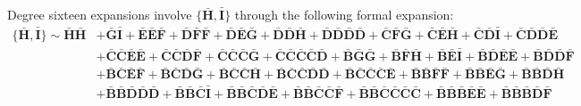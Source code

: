 \documentclass[10pt]{amsart}
\theoremstyle{definition}
\theoremstyle{corollary}
\theoremstyle{remark}
\theoremstyle{conclusion}
\begin{document}
Degree sixteen expansions involve $\{\bar{\mathbf{H}},\bar{\mathbf{I}} \}$ through the following formal expansion:
\begin{align}
	\{\bar{\mathbf{H}}, \bar{\mathbf{I}}\} \sim \bar{\mathbf{H}}\bar{\mathbf{H}}&+\bar{\mathbf{G}}\bar{\mathbf{I}}+\bar{\mathbf{E}}\bar{\mathbf{E}}\bar{\mathbf{F}}+\bar{\mathbf{D}}\bar{\mathbf{F}}\bar{\mathbf{F}}+\bar{\mathbf{D}}\bar{\mathbf{E}}\bar{\mathbf{G}}+\bar{\mathbf{D}}\bar{\mathbf{D}}\bar{\mathbf{H}}+\bar{\mathbf{D}}\bar{\mathbf{D}}\bar{\mathbf{D}}\bar{\mathbf{D}}+\bar{\mathbf{C}}\bar{\mathbf{F}}\bar{\mathbf{G}}+\bar{\mathbf{C}}\bar{\mathbf{E}}\bar{\mathbf{H}}+\bar{\mathbf{C}}\bar{\mathbf{D}}\bar{\mathbf{I}}+\bar{\mathbf{C}}\bar{\mathbf{D}}\bar{\mathbf{D}}\bar{\mathbf{E}}\nonumber \\
	&+\bar{\mathbf{C}}\bar{\mathbf{C}}\bar{\mathbf{E}}\bar{\mathbf{E}}+\bar{\mathbf{C}}\bar{\mathbf{C}}\bar{\mathbf{D}}\bar{\mathbf{F}}+\bar{\mathbf{C}}\bar{\mathbf{C}}\bar{\mathbf{C}}\bar{\mathbf{G}}+\bar{\mathbf{C}}\bar{\mathbf{C}}\bar{\mathbf{C}}\bar{\mathbf{C}}\bar{\mathbf{D}}+\bar{\mathbf{B}}\bar{\mathbf{G}}\bar{\mathbf{G}}+\bar{\mathbf{B}}\bar{\mathbf{F}}\bar{\mathbf{H}}+\bar{\mathbf{B}}\bar{\mathbf{E}}\bar{\mathbf{I}}+\bar{\mathbf{B}}\bar{\mathbf{D}}\bar{\mathbf{E}}\bar{\mathbf{E}}+\bar{\mathbf{B}}\bar{\mathbf{D}}\bar{\mathbf{D}}\bar{\mathbf{F}}\nonumber\\
	&+\bar{\mathbf{B}}\bar{\mathbf{C}}\bar{\mathbf{E}}\bar{\mathbf{F}}+\bar{\mathbf{B}}\bar{\mathbf{C}}\bar{\mathbf{D}}\bar{\mathbf{G}}+\bar{\mathbf{B}}\bar{\mathbf{C}}\bar{\mathbf{C}}\bar{\mathbf{H}}+\bar{\mathbf{B}}\bar{\mathbf{C}}\bar{\mathbf{C}}\bar{\mathbf{D}}\bar{\mathbf{D}}+\bar{\mathbf{B}}\bar{\mathbf{C}}\bar{\mathbf{C}}\bar{\mathbf{C}}\bar{\mathbf{E}}+\bar{\mathbf{B}}\bar{\mathbf{B}}\bar{\mathbf{F}}\bar{\mathbf{F}}+\bar{\mathbf{B}}\bar{\mathbf{B}}\bar{\mathbf{E}}\bar{\mathbf{G}}+\bar{\mathbf{B}}\bar{\mathbf{B}}\bar{\mathbf{D}}\bar{\mathbf{H}}\nonumber \\
	&+ \bar{\mathbf{B}}\bar{\mathbf{B}}\bar{\mathbf{D}}\bar{\mathbf{D}}\bar{\mathbf{D}}+\bar{\mathbf{B}}\bar{\mathbf{B}}\bar{\mathbf{C}}\bar{\mathbf{I}}+\bar{\mathbf{B}}\bar{\mathbf{B}}\bar{\mathbf{C}}\bar{\mathbf{D}}\bar{\mathbf{E}}+\bar{\mathbf{B}}\bar{\mathbf{B}}\bar{\mathbf{C}}\bar{\mathbf{C}}\bar{\mathbf{F}}+\bar{\mathbf{B}}\bar{\mathbf{B}}\bar{\mathbf{C}}\bar{\mathbf{C}}\bar{\mathbf{C}}\bar{\mathbf{C}}+\bar{\mathbf{B}}\bar{\mathbf{B}}\bar{\mathbf{B}}\bar{\mathbf{E}}\bar{\mathbf{E}}+\bar{\mathbf{B}}\bar{\mathbf{B}}\bar{\mathbf{B}}\bar{\mathbf{D}}\bar{\mathbf{F}} \nonumber \\

\end{align}
\end{document}
